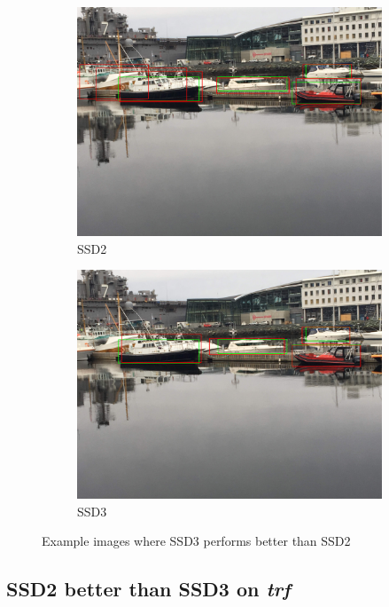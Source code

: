 \begin{figure}[h!]
\begin{subfigure}{.5\textwidth}
  \centering
  \includegraphics[width=0.8\linewidth]{results/case_buildings/ssdtrf/ssd2/3better/IMG_2728.jpg}
  \caption{SSD2}
\end{subfigure}%
\begin{subfigure}{.5\textwidth}
  \centering
  \includegraphics[width=.8\linewidth]{results/case_buildings/ssdtrf/ssd3/3better/IMG_2728.jpg}
  \caption{SSD3}
\end{subfigure}
\caption{Example images where SSD3 performs better than SSD2}
\label{img:ssd_trf_3better}
\end{figure}

\newpage

\subsection{SSD2 better than SSD3 on \textit{trf}}
\label{sec_ssd2_better_trf}


